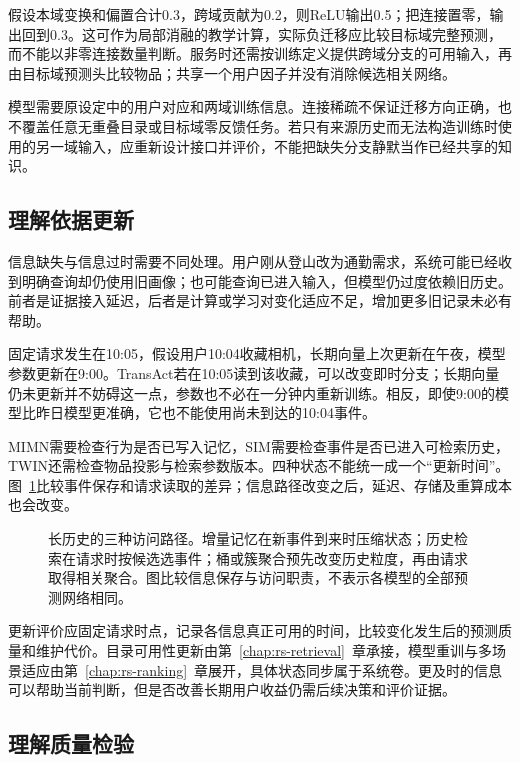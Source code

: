 假设本域变换和偏置合计0.3，跨域贡献为0.2，则ReLU输出0.5；把连接置零，输出回到0.3。这可作为局部消融的教学计算，实际负迁移应比较目标域完整预测，而不能以非零连接数量判断。服务时还需按训练定义提供跨域分支的可用输入，再由目标域预测头比较物品；共享一个用户因子并没有消除候选相关网络。

模型需要原设定中的用户对应和两域训练信息。连接稀疏不保证迁移方向正确，也不覆盖任意无重叠目录或目标域零反馈任务。若只有来源历史而无法构造训练时使用的另一域输入，应重新设计接口并评价，不能把缺失分支静默当作已经共享的知识。

\subsection{理解依据更新}
\label{sec:rs-evidence-refresh}

信息缺失与信息过时需要不同处理。用户刚从登山改为通勤需求，系统可能已经收到明确查询却仍使用旧画像；也可能查询已进入输入，但模型仍过度依赖旧历史。前者是证据接入延迟，后者是计算或学习对变化适应不足，增加更多旧记录未必有帮助。

固定请求发生在10:05，假设用户10:04收藏相机，长期向量上次更新在午夜，模型参数更新在9:00。TransAct若在10:05读到该收藏，可以改变即时分支；长期向量仍未更新并不妨碍这一点，参数也不必在一分钟内重新训练。相反，即使9:00的模型比昨日模型更准确，它也不能使用尚未到达的10:04事件。

MIMN需要检查行为是否已写入记忆，SIM需要检查事件是否已进入可检索历史，TWIN还需检查物品投影与检索参数版本。四种状态不能统一成一个“更新时间”。图~\ref{fig:rs-history-access}比较事件保存和请求读取的差异；信息路径改变之后，延迟、存储及重算成本也会改变。

\begin{figure}[htbp]
  \centering
  
  \caption{长历史的三种访问路径。增量记忆在新事件到来时压缩状态；历史检索在请求时按候选选事件；桶或簇聚合预先改变历史粒度，再由请求取得相关聚合。图比较信息保存与访问职责，不表示各模型的全部预测网络相同。}
  \label{fig:rs-history-access}
\end{figure}

更新评价应固定请求时点，记录各信息真正可用的时间，比较变化发生后的预测质量和维护代价。目录可用性更新由第~\ref{chap:rs-retrieval}~章承接，模型重训与多场景适应由第~\ref{chap:rs-ranking}~章展开，具体状态同步属于系统卷。更及时的信息可以帮助当前判断，但是否改善长期用户收益仍需后续决策和评价证据。

\subsection{理解质量检验}
\label{sec:rs-understanding-quality}

